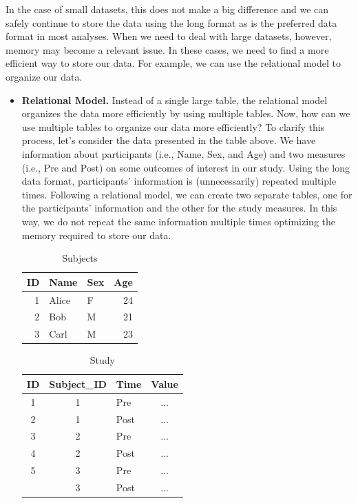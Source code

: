 \documentclass[
  11pt,
]{book}
\begin{document}
In the case of small datasets, this does not make a big difference and we can safely continue to store the data using the long format as is the preferred data format in most analyses. When we need to deal with large datasets, however, memory may become a relevant issue. In these cases, we need to find a more efficient way to store our data. For example, we can use the relational model to organize our data.

\begin{itemize}
\item
  \textbf{Relational Model.} Instead of a single large table, the relational model organizes the data more efficiently by using multiple tables. Now, how can we use multiple tables to organize our data more efficiently? To clarify this process, let's consider the data presented in the table above. We have information about participants (i.e., Name, Sex, and Age) and two measures (i.e., Pre and Post) on some outcomes of interest in our study. Using the long data format, participants' information is (unnecessarily) repeated multiple times. Following a relational model, we can create two separate tables, one for the participants' information and the other for the study measures. In this way, we do not repeat the same information multiple times optimizing the memory required to store our data.

  \begin{table}[!h]

    \caption{\label{tab:unnamed-chunk-25}Subjects}
    \centering
    \begin{tabular}[t]{rllr}
    \toprule
    ID & Name & Sex & Age\\
    \midrule
    1 & Alice & F & 24\\
    2 & Bob & M & 21\\
    3 & Carl & M & 23\\
    \bottomrule
    \end{tabular}
    \end{table}

  \begin{table}[!h]

    \caption{\label{tab:unnamed-chunk-25}Study}
    \centering
    \begin{tabular}[t]{cclc}
    \toprule
    ID & Subject\_ID & Time & Value\\
    \midrule
    1 & 1 & Pre & ...\\
    2 & 1 & Post & ...\\
    3 & 2 & Pre & ...\\
    4 & 2 & Post & ...\\
    5 & 3 & Pre & ...\\
    \addlinespace
    6 & 3 & Post & ...\\
    \bottomrule
    \end{tabular}
    \end{table}


\end{itemize}
\end{document}
